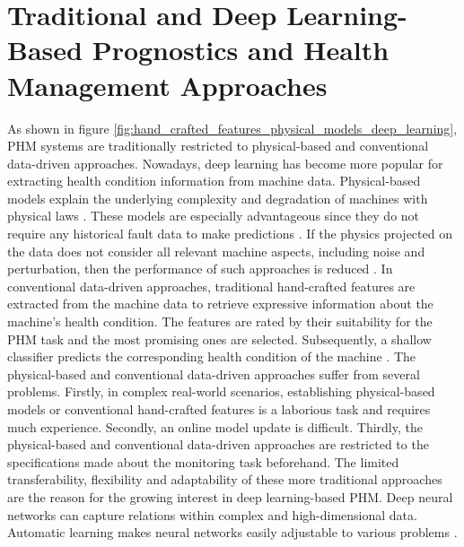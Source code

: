 \section{Traditional and Deep Learning-Based Prognostics and Health Management Approaches}
As shown in figure \ref{fig:hand_crafted_features_physical_models_deep_learning}, PHM systems are traditionally restricted to physical-based and conventional data-driven approaches. Nowadays, deep learning has become more popular for extracting health condition information from machine data. Physical-based models explain the underlying complexity and degradation of machines with physical laws \cite{ZHAO2019213}. These models are especially advantageous since they do not require any historical fault data to make predictions \cite{Benker2019}. If the physics projected on the data does not consider all relevant machine aspects, including noise and perturbation, then the performance of such approaches is reduced \cite{ZHAO2019213}. In conventional data-driven approaches, traditional hand-crafted features are extracted from the machine data to retrieve expressive information about the machine's health condition. The features are rated by their suitability for the PHM task and the most promising ones are selected. Subsequently, a shallow classifier predicts the corresponding health condition of the machine \cite{ZHAO2019213}. The physical-based and conventional data-driven approaches suffer from several problems. Firstly, in complex real-world scenarios, establishing physical-based models or conventional hand-crafted features is a laborious task and requires much experience. Secondly, an online model update is difficult. Thirdly, the physical-based and conventional data-driven approaches are restricted to the specifications made about the monitoring task beforehand. The limited transferability, flexibility and adaptability of these more traditional approaches are the reason for the growing interest in deep learning-based PHM. Deep neural networks can capture relations within complex and high-dimensional data. Automatic learning makes neural networks easily adjustable to various problems \cite{ZHAO2019213}.
